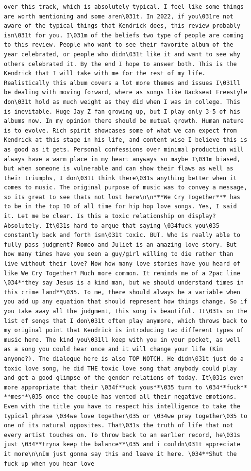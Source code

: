 \documentclass[
  letterpaper,
  DIV=11,
  numbers=noendperiod]{scrreprt}
\begin{document}
\begin{verbatim}
over this track, which is absolutely typical. I feel like some things are worth mentioning and some aren\031t. In 2022, if you\031re not aware of the typical things that Kendrick does, this review probably isn\031t for you. I\031m of the beliefs two type of people are coming to this review. People who want to see their favorite album of the year celebrated, or people who didn\031t like it and want to see why others celebrated it. By the end I hope to answer both. This is the Kendrick that I will take with me for the rest of my life. Realistically this album covers a lot more themes and issues I\031ll be dealing with moving forward, where as songs like Backseat Freestyle don\031t hold as much weight as they did when I was in college. This is inevitable. Huge Jay Z fan growing up, but I play only 3-5 of his albums now. In my opinion there should be mutual growth. Human nature is to evolve. Rich spirit showcases some of what we can expect from Kendrick at this stage in his life, and content wise I believe this is as good as it gets. Personal confessions over minimal production will always have a warm place in my heart anyways so maybe I\031m biased, but when someone is vulnerable and can show their flaws as well as their triumphs, I don\031t think there\031s anything better when it comes to music. The original purpose of music was to convey a message, so its great to see thats not lost here\n\n***We Cry Together*** has to be in the top 10 of all time for hip hop love songs. Yes, I said it. Let me be clear. Is this a toxic relationship on display? Absolutely. It\031s hard to argue that saying \034fuck you\035 constantly back and forth isn\031t toxic. BUT. Who is really able to fully pass judgment? Romeo and Juliet is an amazing love story. But how many times have you seen a guy/girl willing to die rather than live without their love? Now how many love stories have you heard of like We Cry Together? Much more common. It reminds me of a 2pac line \034**they say Jesus is a kind man, but we should understand times in this crime land**\035. To me, there should always be a variable when you add up any equation that should represent how things change. So if you take away all the judgment, this song is beautiful. It\031s on the list of songs that I don\031t often play anymore, which throws back to my original point that Kendrick is introducing two different types of music here. The kind you\031ll keep with you in your pocket, as well as a song you could hear once and it will change your life (Kim anyone?). The dialogue here is also TOP NOTCH. He didn\031t just do a toxic love song, he did THE toxic love song that anybody could play and get a good glimpse of the gender relations of today. It\031s even more appropriate that their \034f**uck yous**\035 turn to \034**fuck** **mes**\035 once the couple has vented all their negative emotions. Even with the title you have to respect his intelligence to take the typical phrase \034we love together\035 or \034we pray together\035 to one of its natural opposites. That\031s the truth of life that not every artist touches on. To throw back to an earlier record, he\031s just \034**tryna keep the balance**\035 and i couldn\031t appreciate it more\n\nIm just gonna say this and leave it here. \034**Shut the fuck up when you hear love 
\end{verbatim}
\end{document}
